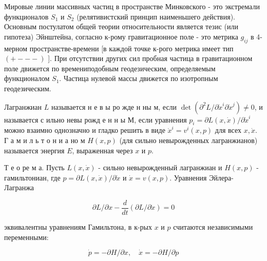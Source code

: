 \documentclass[10pt]{article}
\begin{document}
Мировые линии массивных частиц в пространстве Минковского - это экстремали функционалов $S_{1}$ и $S_{2}$ (релятивистский принцип наименьшего действия). Основным постулатом общей теории относительности является тезис (или гипотеза) Эйнштейна, согласно к-рому гравитационное поле - это метрика $g_{i j}$ в 4-мерном пространстве-времени [в каждой точке к-рого метрика имеет тип $(+---)$ ]. При отсутствии других сил пробная частица в гравитационном поле движется по времениподобным геодезическим, определяемым функционалом $S_{1}$. Частица нулевой массы движется по изотропным геодезическим.



Лагранжиан $L$ называется н е в ы ро жде н ны м, если $\operatorname{det}\left(\partial^{2} L / \partial \dot{x}^{i} \partial \dot{x}^{j}\right) \neq 0$, и называется с ильно невы рожд е н н ы М, если уравнения $p_{i}=\partial L(x, \dot{x}) / \partial \dot{x}^{i}$ можно взаимно однозначно и гладко решить в виде $\dot{x}^{i}=v^{i}(x, p)$ для всех $x, \dot{x}$. Г а м и л ь т о н и а но м $H(x, p)$ (для сильно невырожденных лагранжианов) называется энергия $E$, выраженная через $x$ и $p$.



Т е о ре м а. Пусть $L(x, \dot{x})$ - сильно невырожденный лагранжиан и $H(x, p)$ - гамильтониан, где $p=\partial L(x, \dot{x}) / \partial \dot{x}$ и $\dot{x}=v(x, p)$. Уравнения Эйлера-Лагранжа



\[

\partial L / \partial x-\frac{d}{d t}(\partial L / \partial \dot{x})=0

\]



эквивалентны уравнениям Гамильтона, в к-рых $x$ и $p$ считаются независимыми переменными:



\[

\dot{p}=-\partial H / \partial x, \quad \dot{x}=-\partial H / \partial p

\]
\end{document}
